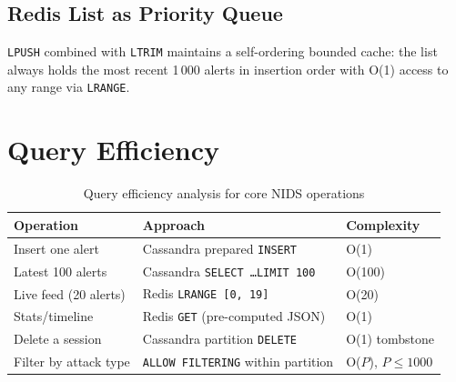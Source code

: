 \documentclass[12pt,a4paper]{report}
\begin{document}
\subsection{Redis List as Priority Queue}
\texttt{LPUSH} combined with \texttt{LTRIM} maintains a self-ordering bounded
cache: the list always holds the most recent 1\,000 alerts in insertion order
with O(1) access to any range via \texttt{LRANGE}.

\section{Query Efficiency}
\begin{table}[H]
  \centering
  \caption{Query efficiency analysis for core NIDS operations}
  \label{tab:efficiency}
  \begin{tabularx}{\textwidth}{lXl}
    \toprule
    \textbf{Operation}      & \textbf{Approach}                          & \textbf{Complexity} \\
    \midrule
    Insert one alert        & Cassandra prepared \texttt{INSERT}         & O(1) \\
    Latest 100 alerts       & Cassandra \texttt{SELECT \ldots LIMIT 100} & O(100) \\
    Live feed (20 alerts)   & Redis \texttt{LRANGE [0,\,19]}             & O(20) \\
    Stats/timeline          & Redis \texttt{GET} (pre-computed JSON)     & O(1) \\
    Delete a session        & Cassandra partition \texttt{DELETE}        & O(1) tombstone \\
    Filter by attack type   & \texttt{ALLOW FILTERING} within partition  & O($P$), $P \leq 1000$ \\
    \bottomrule
  \end{tabularx}
\end{table}
\end{document}
